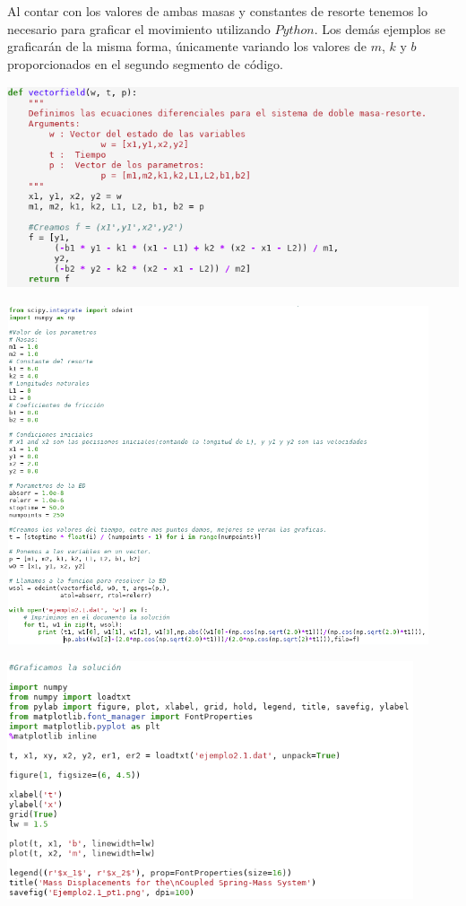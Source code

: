 \documentclass{article}
\begin{document}
Al contar con los valores de ambas masas y constantes de resorte tenemos lo necesario para graficar el movimiento utilizando $Python$. Los demás ejemplos se graficarán de la misma forma, únicamente variando los valores de $m$, $k$ y $b$ proporcionados en el segundo segmento de código.

	\begin{center}
    \includegraphics[height=6cm]{vecfield.png}
    \end{center}
    
    \begin{center}
    \includegraphics[height=10cm]{point21.png}
    \end{center}   
    
    \begin{center}
    \includegraphics[height=7cm]{graf21.png}
    \end{center}
    
\end{document}

